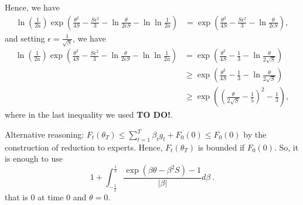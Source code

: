 \documentclass{colt2016_empty} %
\begin{document}
Hence, we have
\begin{align}
\ln(\frac{1}{2a}) \exp\left(\frac{\theta^2}{4 S} - \frac{S \epsilon^2}{3} - \ln\frac{\theta}{2\epsilon S}- \ln \ln \frac{1}{2 a}\right)
&=\exp\left(\frac{\theta^2}{4 S} - \frac{S \epsilon^2}{3} - \ln\frac{\theta}{2\epsilon S}\right),
\end{align}
and setting $\epsilon=\frac{1}{\sqrt{S}}$, we have
\begin{align}
\ln(\frac{1}{2a}) \exp\left(\frac{\theta^2}{4 S} - \frac{S \epsilon^2}{3} - \ln\frac{\theta}{2\epsilon S}- \ln \ln \frac{1}{2 a}\right)
&=\exp\left(\frac{\theta^2}{4 S} - \frac{1}{3} - \ln\frac{\theta}{2 \sqrt{S}}\right) \\
&\geq \exp\left(\frac{\theta^2}{4 S} - \frac{1}{3} - \ln\frac{\theta}{2 \sqrt{S}}\right) \\
&\geq \exp\left(\left(\frac{\theta}{2 \sqrt{S}} - \frac{1}{5}\right)^2 - \frac{1}{3}\right),
\end{align}
where in the last inequality we used \textbf{TO DO!}.

Alternative reasoning: $F_t(\theta_T) \leq \sum_{t=1}^T \beta_t g_t + F_0(0)\leq F_0(0)$ by the construction of reduction to experts. Hence, $F_t(\theta_T)$ is bounded if $F_0(0)$. So, it is enough to use
\[
1+\int_{-\frac{1}{2}}^{\frac{1}{2}} \frac{\exp\left(\beta \theta - \beta^2 S \right)-1}{|\beta|} d \beta~.
\]
that is 0 at time 0 and $\theta=0$.

\end{document}
